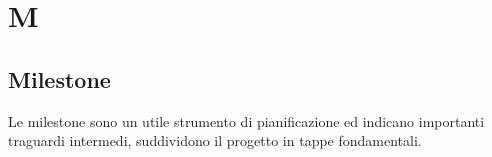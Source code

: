 \section{M}
\subsection{Milestone}%
Le milestone sono un utile strumento di pianificazione ed indicano importanti traguardi intermedi,  suddividono il progetto in tappe fondamentali.
\clearpage
